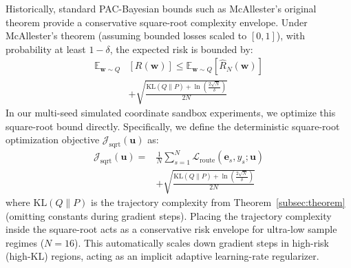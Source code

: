 Historically, standard PAC-Bayesian bounds such as McAllester's original theorem provide a conservative square-root complexity envelope. Under McAllester's theorem (assuming bounded losses scaled to $[0, 1]$), with probability at least $1-\delta$, the expected risk is bounded by:
\begin{equation}
\label{eq:mcallester}
\begin{split}
\mathbb{E}_{\mathbf{w} \sim Q} &[R(\mathbf{w})] \le \mathbb{E}_{\mathbf{w} \sim Q} [\hat{R}_N(\mathbf{w})] \\
&+ \sqrt{\frac{\text{KL}(Q \| P) + \ln\left(\frac{2\sqrt{N}}{\delta}\right)}{2N}}
\end{split}
\end{equation}
In our multi-seed simulated coordinate sandbox experiments, we optimize this square-root bound directly. Specifically, we define the deterministic square-root optimization objective $\mathcal{J}_{\text{sqrt}}(\mathbf{u})$ as:
\begin{equation}
\label{eq:objective_sqrt}
\begin{split}
\mathcal{J}_{\text{sqrt}}(\mathbf{u}) = &\frac{1}{N} \sum_{s=1}^N \mathcal{L}_{\text{route}}(\mathbf{e}_s, y_s; \mathbf{u}) \\
&+ \sqrt{\frac{\text{KL}(Q \| P) + \ln\left(\frac{2\sqrt{N}}{\delta}\right)}{2N}}
\end{split}
\end{equation}
where $\text{KL}(Q \| P)$ is the trajectory complexity from Theorem~\ref{subsec:theorem} (omitting constants during gradient steps). Placing the trajectory complexity inside the square-root acts as a conservative risk envelope for ultra-low sample regimes ($N=16$). This automatically scales down gradient steps in high-risk (high-KL) regions, acting as an implicit adaptive learning-rate regularizer.

